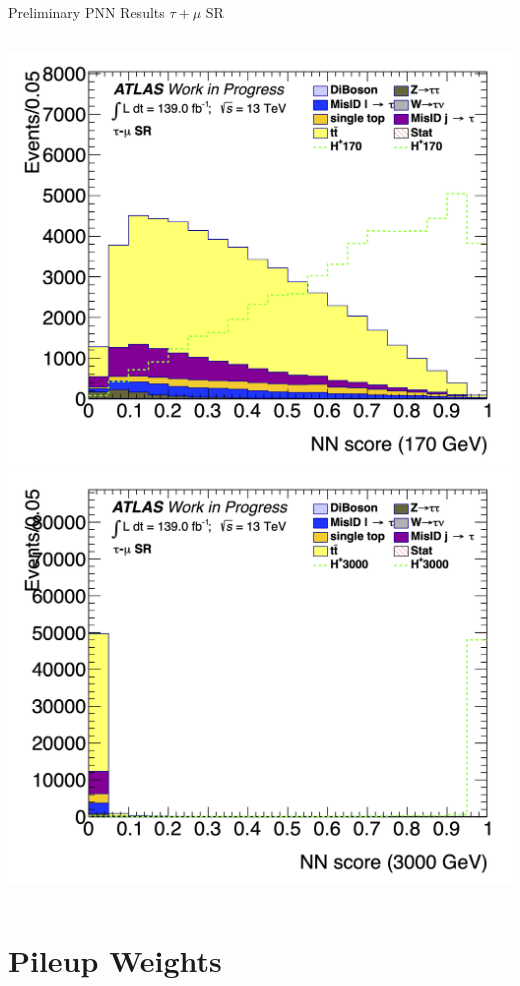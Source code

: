 \documentclass[aspectratio=169,xcolor=table]{beamer}
\begin{document}
\begin{frame}[t]{Preliminary PNN Results $\tau+\mu$ SR}
\begin{columns}[t]
        \includegraphics[height=.43\textheight,keepaspectratio=true]{Scores/taulep/myOutDirClfEval_1p_noUpsilon_test_full/clf_score_GB200_mass_170to170_SR_TAUMU.png}
        \includegraphics[height=.43\textheight,keepaspectratio=true]{Scores/taulep/myOutDirClfEval_1p_noUpsilon_test_full/clf_score_GB200_mass_3000to3000_SR_TAUMU.png}
      \end{columns}
    \end{frame}

  \section{Pileup Weights }
\end{document}
